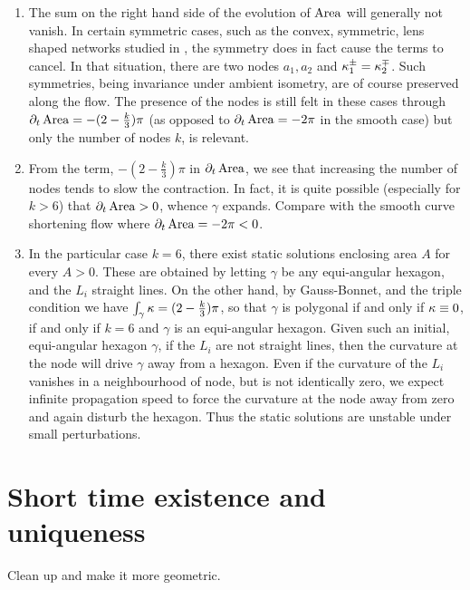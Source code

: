 \documentclass[11pt]{amsart}
\begin{document}
\begin{remark}
\begin{enumerate}
\item The sum on the right hand side of the evolution of \(\operatorname{Area}\) will generally not vanish. In certain symmetric cases, such as the convex, symmetric, lens shaped networks studied in \cite{MR2763716}, the symmetry does in fact cause the terms to cancel. In that situation, there are two nodes \(a_1, a_2\) and \(\operatorname{\kappa}^{\pm}_1 = \operatorname{\kappa}^{\mp}_2\). Such symmetries, being invariance under ambient isometry, are of course preserved along the flow. The presence of the nodes is still felt in these cases through \(\partial_t \operatorname{Area} = -(2- \tfrac{k}{3})\pi\) (as opposed to \(\partial_t \operatorname{Area} = - 2\pi\) in the smooth case) but only the number of nodes \(k\), is relevant.

\item From the term, \(-(2- \tfrac{k}{3})\pi\) in \(\partial_t \operatorname{Area}\), we see that increasing the number of nodes tends to slow the contraction. In fact, it is quite possible (especially for \(k > 6\)) that \(\partial_t \operatorname{Area} > 0\), whence \(\gamma\) expands. Compare with the smooth curve shortening flow where \(\partial_t \operatorname{Area} = - 2\pi < 0\).

\item In the particular case \(k = 6\), there exist static solutions enclosing area \(A\) for every \(A > 0\). These are obtained by letting \(\gamma\) be any equi-angular hexagon, and the \(L_i\) straight lines. On the other hand, by Gauss-Bonnet, and the triple condition we have \(\int_{\gamma} \operatorname{\kappa} = (2 - \tfrac{k}{3}) \pi\), so that \(\gamma\) is polygonal if and only if \(\operatorname{\kappa} \equiv 0\), if and only if \(k = 6\) and \(\gamma\) is an equi-angular hexagon. Given such an initial, equi-angular hexagon \(\gamma\), if the \(L_i\) are not straight lines, then the curvature at the node will drive \(\gamma\) away from a hexagon. Even if the curvature of the \(L_i\) vanishes in a neighbourhood of node, but is not identically zero, we expect infinite propagation speed to force the curvature at the node away from zero and again disturb the hexagon. Thus the static solutions are unstable under small perturbations.

\end{enumerate}
\end{remark}

\section{Short time existence and uniqueness}
\label{sec:orgheadline6}
Clean up \cite{MR1240580} and make it more geometric.
\end{document}
